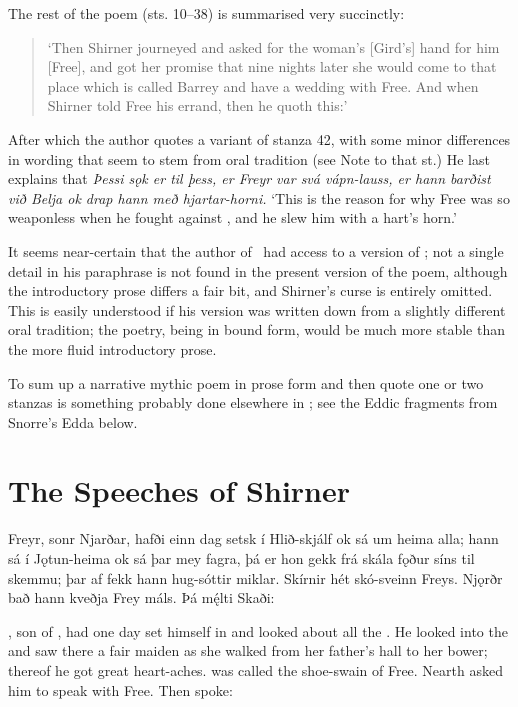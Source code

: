 The rest of the poem (sts. 10–38) is summarised very succinctly:

\begin{quote}‘Then Shirner journeyed and asked for the woman’s [Gird’s] hand for him [Free], and got her promise that nine nights later she would come to that place which is called Barrey and have a wedding with Free.  And when Shirner told Free his errand, then he quoth this:’\end{quote}

After which the author quotes a variant of stanza 42, with some minor differences in wording that seem to stem from oral tradition (see Note to that st.)  He last explains that \emph{Þessi sǫk er til þess, er Freyr var svá vápn-lauss, er hann barðist við Belja ok drap hann með hjartar-horni.} ‘This is the reason for why Free was so weaponless when he fought against , and he slew him with a hart’s horn.’

It seems near-certain that the author of \Gylfaginning\ had access to a version of \Skirnismal; not a single detail in his paraphrase is not found in the present version of the poem, although the introductory prose differs a fair bit, and Shirner’s curse is entirely omitted.  This is easily understood if his version was written down from a slightly different oral tradition; the poetry, being in bound form, would be much more stable than the more fluid introductory prose.

To sum up a narrative mythic poem in prose form and then quote one or two stanzas is something probably done elsewhere in \Gylfaginning; see the Eddic fragments from Snorre’s Edda below.

\sectionline

\section{The Speeches of Shirner}

\bpg\bpa{}%
Freyr, sonr Njarðar, hafði einn dag setsk í Hlið-skjálf ok sá um heima alla; hann sá í Jǫtun-heima ok sá þar mey fagra, þá er hon gekk frá skála fǫður síns til skemmu; þar af fekk hann hug-sóttir miklar. Skírnir hét skó-sveinn Freys. Njǫrðr bað hann kveðja Frey máls. Þá mę́lti Skaði:\epa

\bpb {}, son of , had one day set himself in  and looked about all the .  He looked into the  and saw there a fair maiden as she walked from her father’s hall to her bower; thereof he got great heart-aches.   was called the shoe-swain of Free.  Nearth asked him to speak with Free.  Then  spoke:\epb\epg


